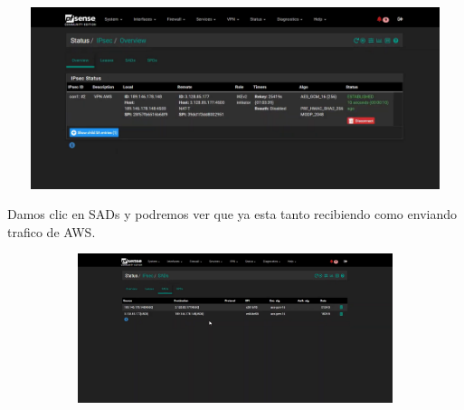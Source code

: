 \documentclass{article} %
\begin{document}
\noindent 

\noindent 

\noindent \includegraphics*[width=6.22in, height=2.09in, trim=0.42in 0.56in 0.09in 0.33in]{image46}

\noindent 

\noindent Damos clic en SADs y podremos ver que ya esta tanto recibiendo como enviando trafico de AWS.  

\noindent 

\noindent 

\noindent \includegraphics*[width=6.14in, height=1.71in, trim=1.04in 1.78in 1.11in 0.38in]{image47}
\end{document}
